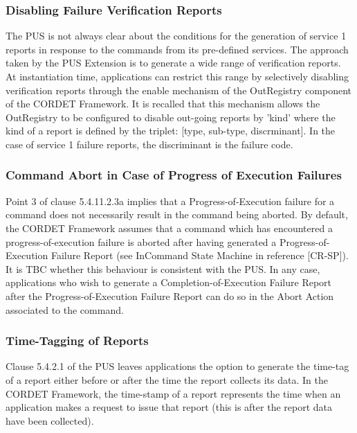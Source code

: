 \documentclass{pnp_article}
\begin{document}
\subsubsection{Disabling Failure Verification Reports} 
The PUS is not always clear about the conditions for the generation of service 1 reports in response to the commands from its pre-defined services. The approach taken by the PUS Extension is to generate a wide range of verification reports. At instantiation time, applications can restrict this range by selectively disabling verification reports through the enable mechanism of the OutRegistry component of the CORDET Framework. It is recalled that this mechanism allows the OutRegistry to be configured to disable out-going reports by 'kind' where the kind of a report is defined by the triplet: [type, sub-type, discrminant]. In the case of service 1 failure reports, the discriminant is the failure code. 
 
\subsubsection{Command Abort in Case of Progress of Execution Failures}
Point 3 of clause 5.4.11.2.3a implies that a Progress-of-Execution failure for a command does not necessarily result in the command being aborted. By default, the CORDET Framework assumes that a command which has encountered a progress-of-execution failure is aborted after having generated a Progress-of-Execution Failure Report (see InCommand State Machine in reference [CR-SP]). It is TBC whether this behaviour is consistent with the PUS. In any case, applications who wish to generate a Completion-of-Execution Failure Report after the Progress-of-Execution Failure Report can do so in the Abort Action associated to the command.

\subsubsection{Time-Tagging of Reports}
Clause 5.4.2.1 of the PUS leaves applications the option to generate the time-tag of a report either before or after the time the report collects its data. In the CORDET Framework, the time-stamp of a report represents the time when an application makes a request to issue that report (this is after the report data have been collected). 
\end{document}
